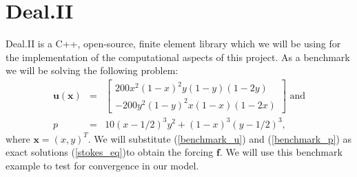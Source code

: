 \documentclass[12pt,a4paper]{article}
\theoremstyle{definition}
\begin{document}
\section{Deal.II}\label{sec_numerics}
Deal.II is a C++, open-source, finite element library which we will be using for the implementation of the computational aspects of this project.  As a benchmark we will be solving the following problem:
\begin{eqnarray}
\label{benchmark_u}
	\textbf{u}\left(\textbf{x}\right)&=&\begin{bmatrix}
	200x^2\left(1-x\right)^2y\left(1-y\right)\left(1-2y\right)  \\
	-200y^2\left(1-y\right)^2x\left(1-x\right)\left(1-2x\right)  
	\end{bmatrix} \text{ and}\\\label{benchmark_p}
	p &=& 10\left(x-1/2\right)^3y^2+\left(1-x\right)^3\left(y-1/2\right)^3,
\end{eqnarray}
where $\textbf{x}=\left(x,y\right)^T$.    We will substitute (\ref{benchmark_u}) and (\ref{benchmark_p}) as exact solutions (\ref{stokes_eq})to obtain the forcing $\textbf{f}$.  We will use this benchmark example to test for convergence in our model.
\end{document}
